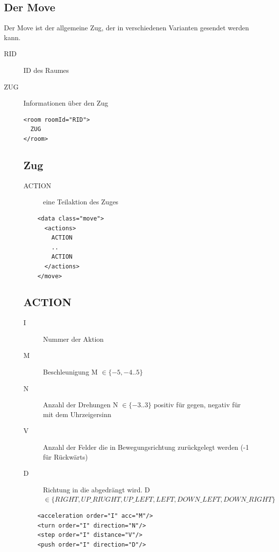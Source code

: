 \documentclass[12pt,a4paper, ngerman, oneside]{scrartcl}
\begin{document}
\subsection{\label{Move}Der Move}
Der Move ist der allgemeine Zug, der in verschiedenen Varianten gesendet werden kann.
\begin{description}
\item[RID] ID des Raumes
\item[ZUG] Informationen über den Zug
\begin{verbatim}
<room roomId="RID">
  ZUG
</room>

\end{verbatim}
\subsection{Zug}
\label{move}
\begin{description}
\item[ACTION] eine Teilaktion des Zuges
\end{description}
\begin{verbatim}
	<data class="move">
	  <actions>
	    ACTION
	    ..
	    ACTION
	  </actions>
	</move>
\end{verbatim}

\subsection{ACTION}
\label{action}
\begin{description}
\item[I] Nummer der Aktion
\item[M] Beschleunigung M $\in \{-5,-4..5\}$
\item[N] Anzahl der Drehungen N $\in \{-3..3\}$ positiv für gegen, negativ für mit dem Uhrzeigersinn
\item[V] Anzahl der Felder die in Bewegungsrichtung zurückgelegt werden (-1 für Rückwärts)
\item[D] Richtung in die abgedrängt wird. D $\in \{RIGHT, UP\_RIUGHT, UP\_LEFT, LEFT, DOWN\_LEFT, DOWN\_RIGHT\}$
\end{description}
\begin{verbatim}
	<acceleration order="I" acc="M"/>
	<turn order="I" direction="N"/>
	<step order="I" distance="V"/>
	<push order="I" direction="D"/>
\end{verbatim}
\end{description}
\end{document}
